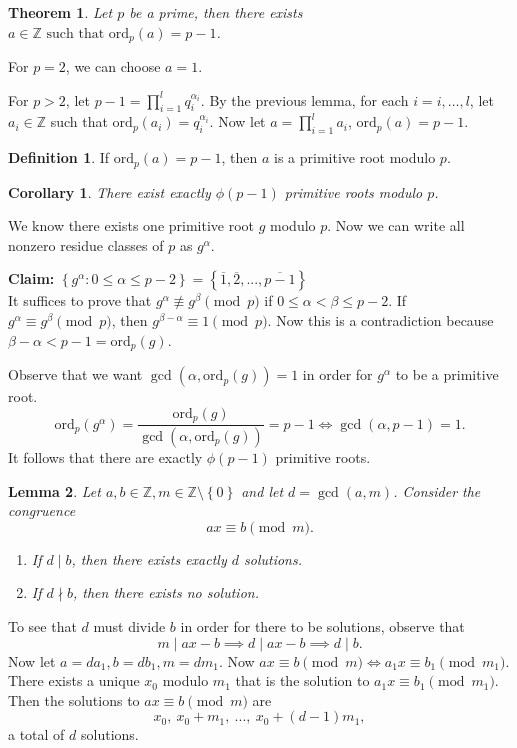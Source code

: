 \documentclass[11pt]{article}
\newtheorem{thm}{Theorem}[section]
\newtheorem{cor}{Corollary}[thm]
\newtheorem{lemma}[thm]{Lemma}
\theoremstyle{definition}
\newtheorem{defn}{Definition}[section]
\newcommand{\ord}[0]{\text{ord}}
\newcommand{\Claim}[0]{\noindent\textbf{Claim: }}
\newcommand{\sm}[0]{\setminus}
\newcommand{\set}[1]{\left\{ #1 \right\}}
\newcommand{\rng}[2]{#1,\dots,#2}
\newcommand{\st}[0]{\text{ such that }}
\newcommand{\ZZ}{\mathbb{Z}}
\begin{document}
\begin{thm}
	Let $p$ be a prime, then there exists $a\in\ZZ \st \ord_p(a) = p-1$. 
\end{thm}
\proof
	For $p=2$, we can choose $a=1$. 

	For $p>2$, let $p-1 = \prod_{i=1}^{l} q_i^{\alpha_i}$. 
	By the previous lemma, for each $i=\rng{i}{l}$, let $a_i\in\ZZ$ such that $\ord_p(a_i) = q_i^{\alpha_i}$. 
	Now let $a = \prod_{i=1}^{l} a_i$, $\ord_p(a) = p-1$. 
\qedhere
\begin{defn}
	If $\ord_p(a) = p-1$, then $a$ is a primitive root modulo $p$. 
\end{defn}

\begin{cor}
	There exist exactly $\phi(p-1)$ primitive roots modulo $p$. 
\end{cor}
\proof
	We know there exists one primitive root $g$ modulo $p$. 
	Now we can write all nonzero residue classes of $p$ as $g^{\alpha}$. 

	\Claim $\set{g^\alpha: 0\le\alpha\le p-2} = \set{\overline{1}, \overline{2}, ..., \overline{p-1}}$ \\
	It suffices to prove that $g^\alpha\not \equiv g^\beta \pmod{p}$ if $0\le\alpha<\beta\le p-2$. 
	If $g^\alpha \equiv g^\beta \pmod{p}$, then $g^{\beta-\alpha} \equiv 1 \pmod{p}$. 
	Now this is a contradiction because $\beta-\alpha < p-1 = \ord_p(g)$. 
	
	Observe that we want $\gcd(\alpha, \ord_p(g)) = 1$ in order for $g^\alpha$ to be a primitive root.
	$$ \ord_p(g^\alpha) = \frac{\ord_p(g)}{\gcd(\alpha, \ord_p(g))} = p-1 \iff \gcd(\alpha, p-1) = 1. $$
	It follows that there are exactly $\phi(p-1)$ primitive roots.
\qedhere



\begin{lemma}
	Let $a,b\in\ZZ, m\in\ZZ\sm\set{0}$ and let $d = \gcd(a,m)$. Consider the congruence 
	$$ ax \equiv b \pmod{m}. $$
	\begin{enumerate}
		\item[(a)] If $d\mid b$, then there exists exactly $d$ solutions.
		\item[(b)] If $d\nmid b$, then there exists no solution.
	\end{enumerate}
\end{lemma}
\proof
	To see that $d$ must divide $b$ in order for there to be solutions, observe that 
	$$ m\mid ax-b \implies d\mid ax-b \implies d\mid b. $$
	Now let $a = da_1, b = db_1, m = dm_1$. Now $ax \equiv b \pmod{m} \iff a_1 x \equiv b_1 \pmod{m_1}$. 
	There exists a unique $x_0$ modulo $m_1$ that is the solution to $a_1 x \equiv b_1 \pmod{m_1}$. 
	Then the solutions to $ax\equiv b \pmod{m}$ are 
	$$ x_0,\ x_0+m_1,\ ...,\ x_0 + (d-1)m_1 , $$
	a total of $d$ solutions. 
\qedhere
\end{document}
